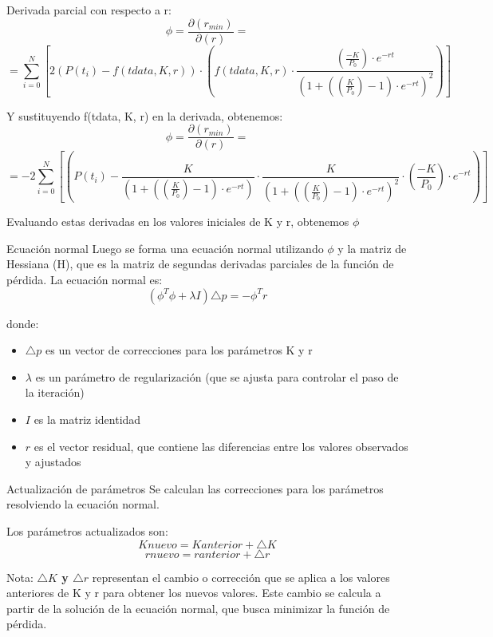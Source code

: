 \documentclass{beamer}
\begin{document}
\begin{frame}  
\begin{block}{Derivada parcial con respecto a r:}
$$\phi = \frac{\partial(r_{min})}{\partial(r)} = $$ 
\small{$$=\sum_{i=0}^{N}[2(P(t_{i}) - f(tdata, K, r)) \cdot (f(tdata, K, r) \cdot \frac{(\frac{-K}{P_{0}}) \cdot e^{-rt}}{(1 + ((\frac{K}{P_{0}}) - 1) \cdot e^{-rt})^{2}})]$$}
\end{block}
\begin{block}{Y sustituyendo  f(tdata, K, r) en la derivada, obtenemos:}
$$\phi = \frac{\partial(r_{min})}{\partial(r)} = $$
\small{$$= -2\sum_{i=0}^{N}[(P(t_{i}) - \frac{K}{(1 + ((\frac{K}{P_{0}}) - 1) \cdot e^{-rt})} \cdot \frac{K}{(1 + ((\frac{K}{P_{0}}) - 1) \cdot e^{-rt})^{2}} \cdot (\frac{-K}{P_{0}}) \cdot e^{-rt})]$$}
\end{block}
Evaluando estas derivadas en los valores iniciales de K y r, obtenemos $\phi$
\end{frame}

\begin{frame}{Ecuación normal}
    Luego se forma una ecuación normal utilizando $\phi$ y la matriz de Hessiana (H), que es la matriz de segundas derivadas parciales de la función de pérdida. La ecuación normal es:
    $$(\phi^{T}\phi + \lambda I)\triangle p = -\phi^{T} r$$
    \begin{block}{donde:}
        \begin{itemize}
            \item $\triangle p$ es un vector de correcciones para los parámetros K y r
            \item $\lambda$ es un parámetro de regularización (que se ajusta para controlar el paso de la iteración)
            \item $I$ es la matriz identidad
            \item $r$ es el vector residual, que contiene las diferencias entre los valores observados y ajustados
        \end{itemize}
    \end{block}
\end{frame}

\begin{frame}{Actualización de parámetros}
Se calculan las correcciones para los parámetros resolviendo la ecuación normal. 
\begin{block}{Los parámetros actualizados son:}
$$Knuevo = Kanterior + \triangle K$$
$$rnuevo = ranterior + \triangle r$$
\end{block}
Nota: \textbf{$\triangle K$ y $\triangle r$} representan el cambio o corrección que se aplica a los valores anteriores de K y r para obtener los nuevos valores. Este cambio se calcula a partir de la solución de la ecuación normal, que busca minimizar la función de pérdida.
\end{frame}
\end{document}
